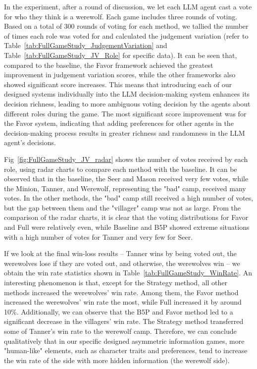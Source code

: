 In the experiment, after a round of discussion, we let each LLM agent cast a vote for who they think is a werewolf. Each game includes three rounds of voting. Based on a total of 300 rounds of voting for each method, we tallied the number of times each role was voted for and calculated the judgement variation (refer to Table~\ref{tab:FullGameStudy_JudgementVariation} and Table~\ref{tab:FullGameStudy_JV_Role} for specific data). It can be seen that, compared to the baseline, the Favor framework achieved the greatest improvement in judgement variation scores, while the other frameworks also showed significant score increases. This means that introducing each of our designed systems individually into the LLM decision-making system enhances its decision richness, leading to more ambiguous voting decision by the agents about different roles during the game. The most significant score improvement was for the Favor system, indicating that adding preferences for other agents in the decision-making process results in greater richness and randomness in the LLM agent's decisions.

Fig~\ref{fig:FullGameStudy_JV_radar} shows the number of votes received by each role, using radar charts to compare each method with the baseline. It can be observed that in the baseline, the Seer and Mason received very few votes, while the Minion, Tanner, and Werewolf, representing the "bad" camp, received many votes. In the other methods, the "bad" camp still received a high number of votes, but the gap between them and the "villager" camp was not as large. From the comparison of the radar charts, it is clear that the voting distributions for Favor and Full were relatively even, while Baseline and B5P showed extreme situations with a high number of votes for Tanner and very few for Seer.


If we look at the final win-loss results – Tanner wins by being voted out, the werewolves lose if they are voted out, and otherwise, the werewolves win – we obtain the win rate statistics shown in Table~\ref{tab:FullGameStudy_WinRate}. An interesting phenomenon is that, except for the Strategy method, all other methods increased the werewolves' win rate. Among them, the Favor method increased the werewolves' win rate the most, while Full increased it by around 10\%. Additionally, we can observe that the B5P and Favor method led to a significant decrease in the villagers' win rate. The Strategy method transferred some of Tanner's win rate to the werewolf camp. Therefore, we can conclude qualitatively that in our specific designed asymmetric information games, more "human-like" elements, such as character traits and preferences, tend to increase the win rate of the side with more hidden information (the werewolf side).


